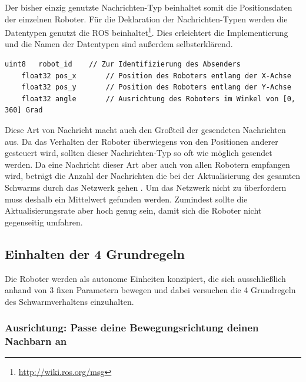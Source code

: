 Der bisher einzig genutzte Nachrichten-Typ beinhaltet somit die Positionsdaten der einzelnen Roboter. Für die Deklaration der Nachrichten-Typen werden die Datentypen genutzt die ROS beinhaltet\footnote{\url{http://wiki.ros.org/msg}}. Dies erleichtert die Implementierung und die Namen der Datentypen sind außerdem selbsterklärend.

\begin{lstlisting}[style=ros, title=Nachrichten-Typ: Robot\_Position]
	uint8	robot_id	// Zur Identifizierung des Absenders
	float32 pos_x		// Position des Roboters entlang der X-Achse
	float32 pos_y		// Position des Roboters entlang der Y-Achse
	float32 angle		// Ausrichtung des Roboters im Winkel von [0, 360] Grad
\end{lstlisting}

Diese Art von Nachricht macht auch den Großteil der gesendeten Nachrichten aus. Da das Verhalten der Roboter überwiegens von den Positionen anderer gesteuert wird, sollten dieser Nachrichten-Typ so oft wie möglich gesendet werden. Da eine Nachricht dieser Art aber auch von allen Robotern empfangen wird, beträgt die Anzahl der Nachrichten die bei der Aktualisierung des gesamten Schwarms durch das Netzwerk gehen . Um das Netzwerk nicht zu überfordern muss deshalb ein Mittelwert gefunden werden. Zumindest sollte die Aktualisierungsrate aber hoch genug sein, damit sich die Roboter nicht gegenseitig umfahren.

\subsection*{Einhalten der 4 Grundregeln}
Die Roboter werden als autonome Einheiten konzipiert, die sich ausschließlich anhand von 3 fixen Parametern bewegen und dabei versuchen die 4 Grundregeln des Schwarmverhaltens einzuhalten.

\subsubsection*{Ausrichtung: Passe deine Bewegungsrichtung deinen Nachbarn an}

